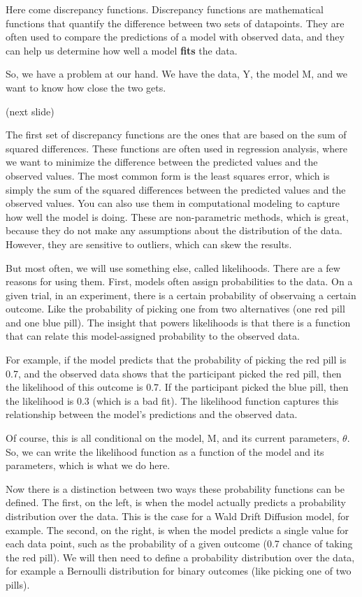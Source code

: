 \documentclass[12pt]{article}
\begin{document}
Here come discrepancy functions. Discrepancy functions are mathematical functions that quantify the difference between two sets of datapoints. They are often used to compare the predictions of a model with observed data, and they can help us determine how well a model \textbf{fits} the data.

So, we have a problem at our hand. We have the data, Y, the model M, and we want to know how close the two gets.

(next slide)

The first set of discrepancy functions are the ones that are based on the sum of squared differences. These functions are often used in regression analysis, where we want to minimize the difference between the predicted values and the observed values. The most common form is the least squares error, which is simply the sum of the squared differences between the predicted values and the observed values. You can also use them in computational modeling to capture how well the model is doing. These are non-parametric methods, which is great, because they do not make any assumptions about the distribution of the data. However, they are sensitive to outliers, which can skew the results.

But most often, we will use something else, called likelihoods. There are a few reasons for using them. First, models often assign probabilities to the data. On a given trial, in an experiment, there is a certain probability of observaing a certain outcome. Like the probability of picking one from two alternatives (one red pill and one blue pill). The insight that powers likelihoods is that there is a function that can relate this model-assigned probability to the observed data.

For example, if the model predicts that the probability of picking the red pill is 0.7, and the observed data shows that the participant picked the red pill, then the likelihood of this outcome is 0.7. If the participant picked the blue pill, then the likelihood is 0.3 (which is a bad fit). The likelihood function captures this relationship between the model's predictions and the observed data.

Of course, this is all conditional on the model, M, and its current parameters, $\theta$. So, we can write the likelihood function as a function of the model and its parameters, which is what we do here.

Now there is a distinction between two ways these probability functions can be defined. The first, on the left, is when the model actually predicts a probability distribution over the data. This is the case for a Wald Drift Diffusion model, for example. The second, on the right, is when the model predicts a single value for each data point, such as the probability of a given outcome (0.7 chance of taking the red pill). We will then need to define a probability distribution over the data, for example a Bernoulli distribution for binary outcomes (like picking one of two pills).
\end{document}
